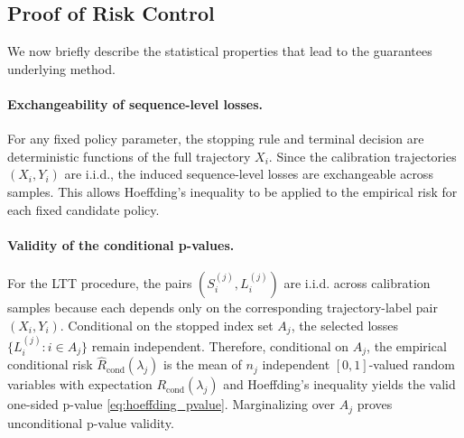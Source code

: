 \subsection{Proof of Risk Control}
\label{appsec:proofs}

We now briefly describe the statistical properties that lead to the guarantees underlying \gls{method}.

\paragraph{Exchangeability of sequence-level losses.}
For any fixed policy parameter, the stopping rule and terminal decision are deterministic functions of the full trajectory $X_i$. Since the calibration trajectories $(X_i,Y_i)$ are i.i.d., the induced sequence-level losses are exchangeable across samples. This allows Hoeffding's inequality to be applied to the empirical risk for each fixed candidate policy.

\paragraph{Validity of the conditional p-values.}
For the LTT procedure, the pairs $(S_i^{(j)},L_i^{(j)})$ are i.i.d. across calibration samples because each depends only on the corresponding trajectory-label pair $(X_i,Y_i)$. Conditional on the stopped index set $A_j$, the selected losses $\{L_i^{(j)}:i\in A_j\}$ remain independent. Therefore, conditional on $A_j$, the empirical conditional risk $\widehat{R}_{\mathrm{cond}}(\lambda_j)$ is the mean of $n_j$ independent $[0,1]$-valued random variables with expectation $R_{\mathrm{cond}}(\lambda_j)$ and Hoeffding's inequality yields the valid one-sided p-value \eqref{eq:hoeffding_pvalue}. Marginalizing over $A_j$ proves unconditional p-value validity.


